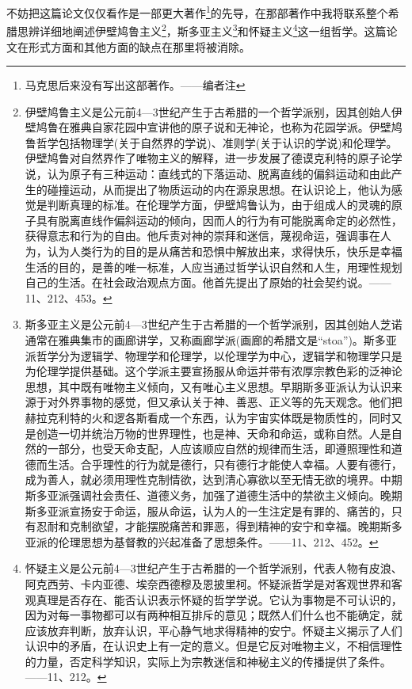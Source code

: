 \documentclass[a4paper,twoside,12pt]{ctexart}
\begin{document}
不妨把这篇论文仅仅看作是一部更大著作\footnote{马克思后来没有写出这部著作。——编者注}的先导，在那部著作中我将联系整个希腊思辨详细地阐述伊壁鸠鲁主义\footnote{伊壁鸠鲁主义是公元前4—3世纪产生于古希腊的一个哲学派别，因其创始人伊壁鸠鲁在雅典自家花园中宣讲他的原子说和无神论，也称为花园学派。伊壁鸠鲁哲学包括物理学(关于自然界的学说)、准则学(关于认识的学说)和伦理学。伊壁鸠鲁对自然界作了唯物主义的解释，进一步发展了德谟克利特的原子论学说，认为原子有三种运动：直线式的下落运动、脱离直线的偏斜运动和由此产生的碰撞运动，从而提出了物质运动的内在源泉思想。在认识论上，他认为感觉是判断真理的标准。在伦理学方面，伊壁鸠鲁认为，由于组成人的灵魂的原子具有脱离直线作偏斜运动的倾向，因而人的行为有可能脱离命定的必然性，获得意志和行为的自由。他斥责对神的崇拜和迷信，蔑视命运，强调事在人为，认为人类行为的目的是从痛苦和恐惧中解放出来，求得快乐，快乐是幸福生活的目的，是善的唯一标准，人应当通过哲学认识自然和人生，用理性规划自己的生活。在社会政治观点方面。他首先提出了原始的社会契约说。——11、212、453。}，斯多亚主义\footnote{斯多亚主义是公元前4—3世纪产生于古希腊的一个哲学派别，因其创始人芝诺通常在雅典集市的画廊讲学，又称画廊学派(画廊的希腊文是“stoa”)。斯多亚派哲学分为逻辑学、物理学和伦理学，以伦理学为中心，逻辑学和物理学只是为伦理学提供基础。这个学派主要宣扬服从命运并带有浓厚宗教色彩的泛神论思想，其中既有唯物主义倾向，又有唯心主义思想。早期斯多亚派认为认识来源于对外界事物的感觉，但又承认关于神、善恶、正义等的先天观念。他们把赫拉克利特的火和逻各斯看成一个东西，认为宇宙实体既是物质性的，同时又是创造一切并统治万物的世界理性，也是神、天命和命运，或称自然。人是自然的一部分，也受天命支配，人应该顺应自然的规律而生活，即遵照理性和道德而生活。合乎理性的行为就是德行，只有德行才能使人幸福。人要有德行，成为善人，就必须用理性克制情欲，达到清心寡欲以至无情无欲的境界。中期斯多亚派强调社会责任、道德义务，加强了道德生活中的禁欲主义倾向。晚期斯多亚派宣扬安于命运，服从命运，认为人的一生注定是有罪的、痛苦的，只有忍耐和克制欲望，才能摆脱痛苦和罪恶，得到精神的安宁和幸福。晚期斯多亚派的伦理思想为基督教的兴起准备了思想条件。——11、212、452。}和怀疑主义\footnote{怀疑主义是公元前4—3世纪产生于古希腊的一个哲学派别，代表人物有皮浪、阿克西劳、卡内亚德、埃奈西德穆及恩披里柯。怀疑派哲学是对客观世界和客观真理是否存在、能否认识表示怀疑的哲学学说。它认为事物是不可认识的，因为对每一事物都可以有两种相互排斥的意见；既然人们什么也不能确定，就应该放弃判断，放弃认识，平心静气地求得精神的安宁。怀疑主义揭示了人们认识中的矛盾，在认识史上有一定的意义。但是它反对唯物主义，不相信理性的力量，否定科学知识，实际上为宗教迷信和神秘主义的传播提供了条件。——11、212。}这一组哲学。这篇论文在形式方面和其他方面的缺点在那里将被消除。
\end{document}
